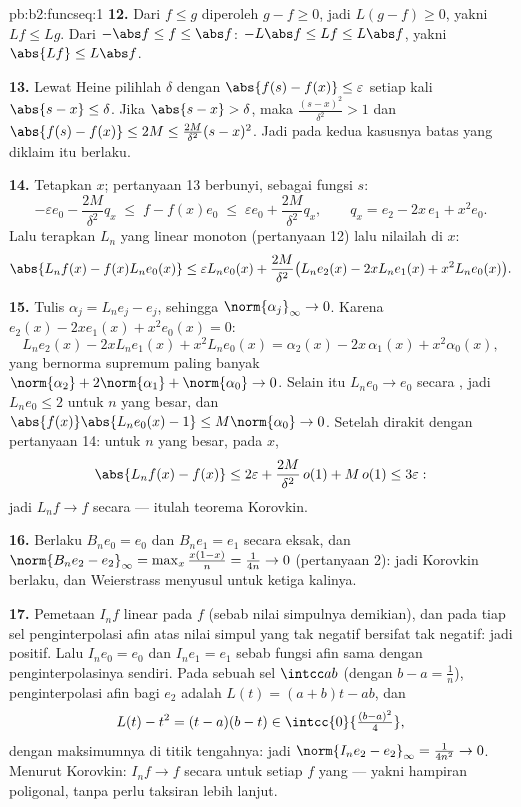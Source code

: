 \begin{solution}{pb:b2:funcseq:1}
\textbf{12.} Dari $f \leq g$ diperoleh $g - f \geq 0$, jadi $L(g-f) \geq
0$, yakni $Lf \leq Lg$. Dari $-\abs f \leq f \leq \abs f$:
$-L\abs f \leq Lf \leq L\abs f$, yakni $\abs{Lf} \leq
L\abs f$.

\textbf{13.} Lewat Heine pilihlah $\delta$ dengan $\abs{f(s)-f(x)}
\leq \varepsilon$ setiap kali $\abs{s-x} \leq \delta$. Jika
$\abs{s - x} > \delta$, maka $\frac{(s-x)^2}{\delta^2} > 1$ dan
$\abs{f(s)-f(x)} \leq 2M \leq \frac{2M}{\delta^2}(s-x)^2$. Jadi pada
kedua kasusnya batas yang diklaim itu berlaku.

\textbf{14.} Tetapkan $x$; pertanyaan 13 berbunyi, sebagai fungsi $s$:
\[
-\varepsilon e_0 - \frac{2M}{\delta^2}q_x
\;\leq\; f - f(x)e_0
\;\leq\; \varepsilon e_0 + \frac{2M}{\delta^2}q_x,
\qquad q_x = e_2 - 2x\,e_1 + x^2e_0 .
\]
Lalu terapkan $L_n$ yang linear monoton (pertanyaan 12) lalu nilailah di
$x$:
\[
\abs{L_nf(x) - f(x)L_ne_0(x)}
\leq \varepsilon L_ne_0(x)
+ \frac{2M}{\delta^2}\bigl(L_ne_2(x) - 2xL_ne_1(x)
+ x^2L_ne_0(x)\bigr) .
\]

\textbf{15.} Tulis $\alpha_j = L_ne_j - e_j$, sehingga
$\norm{\alpha_j}_\infty \to 0$. Karena $e_2(x) - 2xe_1(x) +
x^2e_0(x) = 0$:
\[
L_ne_2(x) - 2xL_ne_1(x) + x^2L_ne_0(x)
= \alpha_2(x) - 2x\,\alpha_1(x) + x^2\alpha_0(x),
\]
yang bernorma supremum paling banyak $\norm{\alpha_2} +
2\norm{\alpha_1} + \norm{\alpha_0} \to 0$. Selain itu $L_ne_0 \to e_0$
secara , jadi $L_ne_0 \leq 2$ untuk $n$ yang besar, dan
$\abs{f(x)}\abs{L_ne_0(x) - 1} \leq M\norm{\alpha_0} \to 0$. Setelah
dirakit dengan pertanyaan 14: untuk $n$ yang besar,  pada $x$,
\[
\abs{L_nf(x) - f(x)} \leq 2\varepsilon +
\frac{2M}{\delta^2}\,o(1) + M\,o(1) \leq 3\varepsilon :
\]
jadi $L_nf \to f$ secara  --- itulah teorema Korovkin.

\textbf{16.} Berlaku $B_ne_0 = e_0$ dan $B_ne_1 = e_1$ secara eksak, dan
$\norm{B_ne_2 - e_2}_\infty = \max_x\frac{x(1-x)}{n} =
\frac{1}{4n} \to 0$ (pertanyaan 2): jadi Korovkin berlaku, dan
Weierstrass menyusul untuk ketiga kalinya.

\textbf{17.} Pemetaan $I_nf$ linear pada $f$ (sebab nilai simpulnya
demikian), dan pada tiap sel penginterpolasi afin atas nilai simpul yang
tak negatif bersifat tak negatif: jadi positif. Lalu $I_ne_0 = e_0$ dan
$I_ne_1 = e_1$ sebab fungsi afin sama dengan penginterpolasinya sendiri.
Pada sebuah sel $\intcc ab$ (dengan $b - a = \frac1n$), penginterpolasi
afin bagi $e_2$ adalah $L(t) = (a+b)t - ab$, dan
\[
L(t) - t^2 = (t-a)(b-t) \in
\intcc{0}{\tfrac{(b-a)^2}{4}} ,
\]
dengan maksimumnya di titik tengahnya: jadi $\norm{I_ne_2 - e_2}_\infty =
\frac{1}{4n^2} \to 0$. Menurut Korovkin: $I_nf \to f$ secara  untuk
setiap $f$ yang  --- yakni hampiran poligonal, tanpa perlu
taksiran lebih lanjut.


\end{solution}
